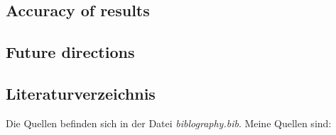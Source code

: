 \documentclass[conference]{IEEEtran}
\begin{document}
	\subsection{Accuracy of results}
	\subsection{Future directions}

\subsection{Literaturverzeichnis}
Die Quellen befinden sich in der Datei \textit{biblography.bib}. 
Meine Quellen sind:
 \cite{George1990} \cite{Asanovic2016} \cite{ArmManual}
 \cite{50years} \cite{hennessy2012computer} \cite{drechsler2020enhanced} \cite{WisconsinMadison2016}  \cite{IEEE2018} \cite{Dirvin2019} \cite{Bandic2019} \cite{ISAfree} \cite{RISC-Assembly} \cite{AndrewWaterman}



\end{document}
